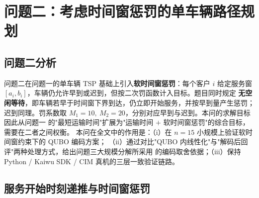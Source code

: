 \documentclass[UTF8,12pt,a4paper]{ctexart}
\begin{document}
\section{问题二：考虑时间窗惩罚的单车辆路径规划}
\label{sec:q2}

\subsection{问题二分析}

问题二在问题一的单车辆 TSP 基础上引入\textbf{软时间窗惩罚}：每个客户 $i$ 给定服务窗
$[a_i,b_i]$，车辆仍允许早到或迟到，但按二次罚函数计入目标。题目同时规定
\textbf{无空闲等待}，即车辆若早于时间窗下界到达，仍立即开始服务，并按早到量产生惩罚；
迟到同理。罚系数取 $M_1=10,\ M_2=20$，分别对应早到与迟到。本问的求解目标因此从问题一
的"最短运输时间"扩展为"运输时间 $+$ 软时间窗惩罚"的综合目标，需要在二者之间权衡。
本问在全文中的作用是：（i）在 $n=15$ 小规模上验证软时间窗约束下的 QUBO 编码方案；
（ii）通过对比"QUBO 内线性化"与"解码后回评"两种处理方式，给出问题三大规模分解所采用
的编码取舍依据；（iii）保持 Python / Kaiwu SDK / CIM 真机的三层一致验证链路。

\subsection{服务开始时刻递推与时间窗惩罚}
\label{subsec:q2-time}
\end{document}
